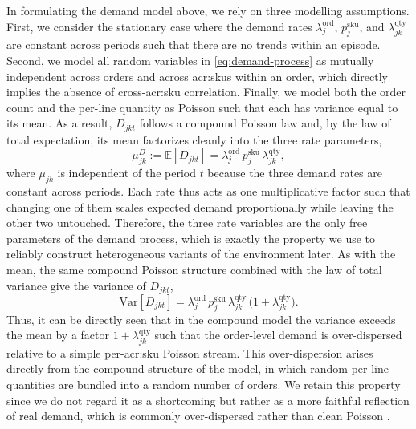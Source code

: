In formulating the demand model above, we rely on three modelling assumptions. First, we consider the stationary case where the demand rates $\lambda^{\mathrm{ord}}_{j}$, $p^{\mathrm{sku}}_{j}$, and $\lambda^{\mathrm{qty}}_{jk}$ are constant across periods such that there are no trends within an episode. Second, we model all random variables in \autoref{eq:demand-process} as mutually independent across orders and across \glspl{acr:sku} within an order, which directly implies the absence of cross-\gls{acr:sku} correlation. Finally, we model both the order count and the per-line quantity as Poisson such that each has variance equal to its mean.
As a result, $D_{jkt}$ follows a compound Poisson law and, by the law of total expectation, its mean factorizes cleanly into the three rate parameters, 
\begin{equation}
\label{eq:expected-demand}
   \mu^D_{jk} := \mathbb{E}[D_{jkt}] = \lambda^{\mathrm{ord}}_{j}\,p^{\mathrm{sku}}_{j}\,
  \lambda^{\mathrm{qty}}_{jk},
\end{equation}
where $\mu_{jk}$ is independent of the period $t$ because the three demand rates are constant across periods. Each rate thus acts as one multiplicative factor such that changing one of them scales expected demand proportionally while leaving the other two untouched. Therefore, the three rate variables are the only free parameters of the demand process, which is exactly the property we use to reliably construct heterogeneous variants of the environment later. As with the mean, the same compound Poisson structure combined with the law of total variance give the variance of $D_{jkt}$,
\begin{equation}
\label{eq:demand-variance}
  \mathrm{Var}[D_{jkt}] = \lambda^{\mathrm{ord}}_{j}\,p^{\mathrm{sku}}_{j}\,\lambda^{\mathrm{qty}}_{jk}\,\bigl(1+\lambda^{\mathrm{qty}}_{jk}\bigr).
\end{equation}
Thus, it can be directly seen that in the compound model the variance exceeds the mean by a factor $1+\lambda^{\mathrm{qty}}_{jk}$ such that the order-level demand is over-dispersed relative to a simple per-\gls{acr:sku} Poisson stream. This over-dispersion arises directly from the compound structure of the model, in which random per-line quantities are bundled into a random number of orders. We retain this property since we do not regard it as a shortcoming but rather as a more faithful reflection of real demand, which is commonly over-dispersed rather than clean Poisson \citep{kourentzes2013intermittent}. 

